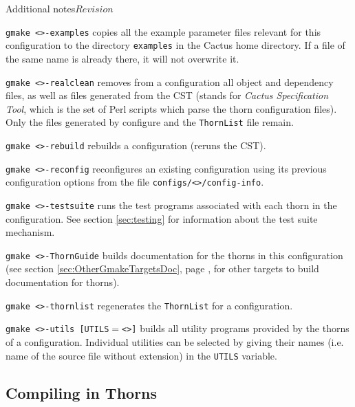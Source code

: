 \begin{cactuspart}{Additional notes}{}{$Revision$}
\begin{Lentry}
\item [\texttt{gmake <\var{config}>-examples}] copies all the example parameter files relevant for this configuration to the directory \texttt{examples} in the Cactus home directory. If a file of the same name is already there, it will not overwrite it.

\item [\texttt{gmake <\var{config}>-realclean}] removes from a configuration
all object and dependency files, as well as files generated from the
CST (stands for \textit{Cactus Specification Tool}, which is the set of Perl scripts
which parse the thorn configuration files).  Only the files generated
by configure and the \texttt{ThornList} file remain.

\item [\texttt{gmake <\var{config}>-rebuild}] rebuilds a configuration (reruns the CST).

\item [\texttt{gmake <\var{config}>-reconfig}] reconfigures an existing
configuration using its previous configuration options from the file
\texttt{configs/<>/config-info}.

\item [\texttt{gmake <\var{config}>-testsuite}] runs the test programs
associated with each thorn in the configuration. See section
\ref{sec:testing} for information about the test suite mechanism.

\item[\texttt{gmake <\var{config}>-ThornGuide}] builds documentation for the
thorns in this configuration
  (see section \ref{sec:OtherGmakeTargetsDoc}, page
  \pageref{sec:OtherGmakeTargetsDoc}, for other targets to build documentation
  for thorns).

\item [\texttt{gmake <\var{config}>-thornlist}] regenerates the
\texttt{ThornList} for a configuration.

\item [\texttt{gmake <\var{config}>-utils [UTILS$=$<\var{list}>]}] builds all
utility programs provided by the thorns of a configuration. Individual
utilities can be selected by giving their names (i.e. name of the source file without extension) in the \texttt{UTILS} variable.

\end{Lentry}



\subsection{Compiling in Thorns}
\label{sec:cointh}


\end{cactuspart}
